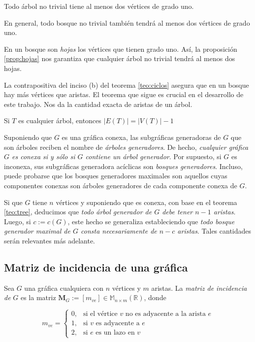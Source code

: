 \begin{prop} \label{prop:hojas}
Todo árbol no trivial tiene al menos dos vértices de grado uno. 
\end{prop}

En general, todo bosque no trivial también tendrá al menos dos vértices de grado uno.  

En un bosque son \textit{hojas} los vértices que tienen grado uno. Así, la proposición \ref{prop:hojas} nos garantiza que cualquier árbol no trivial tendrá al menos dos hojas.

La contrapositiva del inciso (b) del teorema \ref{teo:ciclos} asegura que en un bosque hay más vértices que aristas. El teorema que sigue es crucial en el desarrollo de este trabajo. Nos da la cantidad exacta de aristas de un árbol.

\begin{teo} \label{teo:tree}
Si $T$ es cualquier árbol, entonces $|E(T)| = |V(T)|-1$ 
\end{teo}

Suponiendo que $G$ es una gráfica conexa, las subgráficas generadoras de $G$ que son árboles reciben el nombre de \textit{árboles generadores}. De hecho, \textit{cualquier gráfica $G$ es conexa si y sólo si $G$ contiene un árbol generador}.  Por supuesto, si $G$ es inconexa, sus subgráficas generadora acíclicas son \textit{bosques generadores}. Incluso, puede probarse que los bosques generadores maximales son aquellos cuyas componentes conexas son árboles generadores de cada componente conexa de $G$.

Si que $G$ tiene $n$ vértices y suponiendo que es conexa, con base en el teorema \ref{teo:tree}, deducimos que \textit{todo árbol generador de $G$ debe tener $n-1$ aristas}. Luego, si $c:=c(G)$, este hecho se generaliza estableciendo que \textit{todo bosque generador maximal de $G$ consta necesariamente de $n-c$ aristas}. Tales cantidades serán relevantes más adelante.


\subsection{Matriz de incidencia de una gráfica} \label{sec:matriz}
Sea $G$ una gráfica cualquiera con $n$ vértices y $m$ aristas. La \textit{matriz de incidencia de} $G$ es la matriz $\mathbf{M}_{G} := [m_{ve}] \in \mathbb{M}_{n \times m}(\mathbb{R})$, donde

$$ m_{ve}=
\begin{cases}
0, & \text{si el vértice } v \text{ no es adyacente a la arista } e \\ 
1, & \text{si } v \text{ es adyacente a } e\\ 
2, & \text{si } e \text{ es un lazo en } v
\end{cases}
$$

